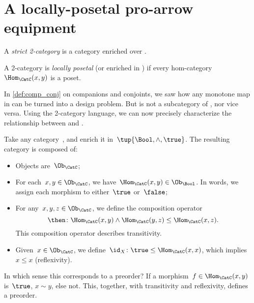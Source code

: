 

\section{A locally-posetal pro-arrow equipment}

\begin{definition}[2-category]
  A \emph{strict 2-category} is a category enriched over \Category.
\end{definition}

\begin{definition}
  \label{def:locallyposetalcat}
  A 2-category \CatC is \emph{locally posetal} (or enriched in \Pos) if every hom-category~$\Hom_{\CatC}(x,y)$ is a poset.
\end{definition}
In \cref{def:comp_conj} on companions and conjoints, we saw how any monotone map in \Pos can be turned into a design problem. But \DP is not a subcategory of \Pos, nor vice versa. Using the 2-category language, we can now precisely characterize the relationship between \Pos and \DP. %

\begin{example}
  Take any category~\CatC, and enrich it in~$\tup{\Bool,\wedge,\true}$. The resulting category is composed of:
  \begin{itemize}
    \item Objects are~$\Ob_\CatC$;
    \item For each~$x,y\in \Ob_\CatC$, we have~$\Hom_\CatC(x,y)\in \Ob_\Bool$. In words, we assign each morphism to either~$\true$ or~$\false$;
    \item For any~$x,y,z\in \Ob_\CatC$, we define the composition operator
    \begin{equation*}
      \then \colon \Hom_\CatC(x,y)\wedge \Hom_\CatC(y,z)\leq \Hom_\CatC(x,z).
    \end{equation*}
    This composition operator describes transitivity.
    \item Given~$x\in \Ob_\CatC$, we define~$\id_X\colon \true \leq \Hom_\CatC(x,x)$, which implies~$x\leq x$ (reflexivity).
  \end{itemize}
  In which sense this corresponds to a preorder? If a morphism~$f\in \Hom_\CatC(x,y)$ is~$\true$, $x\sim y$, else not. This, together, with transitivity and reflexivity, defines a preorder.
\end{example}

